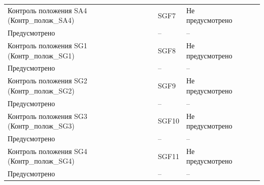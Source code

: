 \begin{longtable}{|>{\centering\arraybackslash}m{5.3cm}|>{\centering\arraybackslash}m{3.3cm}|>{\centering\arraybackslash}m{4.2cm}|>{\centering\arraybackslash}m{1.8cm}|>{\centering\arraybackslash}m{1cm}|}
\hline
\centering Контроль положения SA4 (Контр\_полож\_SA4)  & \centering SGF7 & \centering Не предусмотрено \\ Предусмотрено & \centering -- & \centering \arraybackslash -- \\
\hline
\centering Контроль положения SG1 (Контр\_полож\_SG1)  & \centering SGF8 & \centering Не предусмотрено \\ Предусмотрено & \centering -- & \centering \arraybackslash -- \\
\hline
\centering Контроль положения SG2 (Контр\_полож\_SG2)  & \centering SGF9 & \centering Не предусмотрено \\ Предусмотрено & \centering -- & \centering \arraybackslash -- \\
\hline
\centering Контроль положения SG3 (Контр\_полож\_SG3)  & \centering SGF10 & \centering Не предусмотрено \\ Предусмотрено & \centering -- & \centering \arraybackslash -- \\
\hline
\centering Контроль положения SG4 (Контр\_полож\_SG4)  & \centering SGF11 & \centering Не предусмотрено \\ Предусмотрено & \centering -- & \centering \arraybackslash -- \\
\hline
\end{longtable}
\normalsize